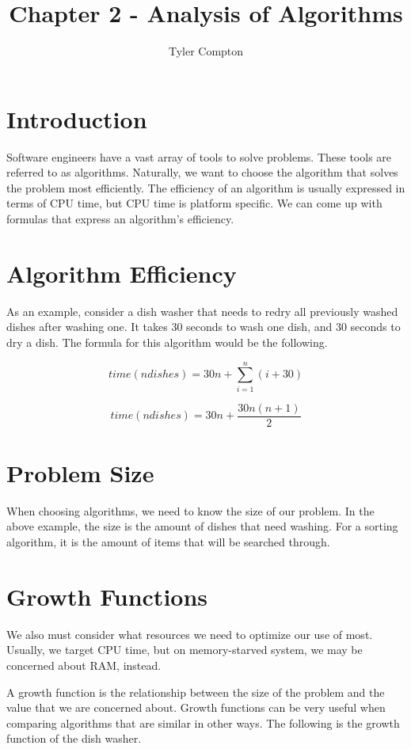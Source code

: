 \documentclass{article}
\author{Tyler Compton}
\title{Chapter 2 - Analysis of Algorithms}
\begin{document}
\maketitle
\tableofcontents

\section{Introduction}
Software engineers have a vast array of tools to solve problems. These tools
are referred to as algorithms. Naturally, we want to choose the algorithm that
solves the problem most efficiently. The efficiency of an algorithm is usually
expressed in terms of CPU time, but CPU time is platform specific. We can come
up with formulas that express an algorithm's efficiency.

\section{Algorithm Efficiency}
As an example, consider a dish washer that needs to redry all previously washed
dishes after washing one. It takes 30 seconds to wash one dish, and 30 seconds
to dry a dish. The formula for this algorithm would be the following.

$$time(ndishes) = 30n + \sum_{i=1}^{n}(i+30)$$

$$time(ndishes) = 30n + \dfrac{30n(n+1)}{2}$$

\section{Problem Size}
When choosing algorithms, we need to know the size of our problem. In the above
example, the size is the amount of dishes that need washing. For a sorting
algorithm, it is the amount of items that will be searched through.

\section{Growth Functions}
We also must consider what resources we need to optimize our use of most.
Usually, we target CPU time, but on memory-starved system, we may be concerned
about RAM, instead.

A growth function is the relationship between the size of the problem and the
value that we are concerned about. Growth functions can be very useful when
comparing algorithms that are similar in other ways. The following is the
growth function of the dish washer.
\end{document}
